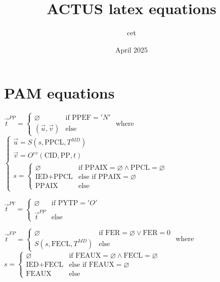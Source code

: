 \documentclass[10pt,a4paper,twoside]{article}
\title{ACTUS latex equations}
\author{cet}
\date{April 2025}
\begin{document}
\maketitle

\tableofcontents


\section{PAM equations}

$\boxed{
    \vec{t}^{PP} = 
    \begin{cases}
        \varnothing & \text{if } \text{PPEF} = 'N' \\
        (\vec{u}, \vec{v}) & \text{else}
    \end{cases}
}$
where $ 
\begin{cases}
    \vec{u} = S(s, \text{PPCL}, T^{MD}) \\
    \vec{v} = O^{ev}(\text{CID}, \text{PP}, t) \\
    s = \begin{cases}
        \varnothing & \text{if } \text{PPAIX} = \varnothing \land \text{PPCL} = \varnothing \\
        \text{IED} + \text{PPCL} & \text{else if } \text{PPAIX} = \varnothing \\
        \text{PPAIX} & \text{else}
    \end{cases}
\end{cases}$

$\boxed{
    \vec{t}^{PY} = 
    \begin{cases}
        \varnothing & \text{if } \text{PYTP} = 'O' \\
        \vec{t}^{PP} & \text{else}
    \end{cases}
}$

$\boxed{
    \vec{t}^{FP} = 
    \begin{cases}
        \varnothing & \text{if } \text{FER} = \varnothing \lor \text{FER} = 0 \\
        S(s, \text{FECL}, T^{MD}) & \text{else}
    \end{cases}
}$
where $s = \begin{cases}
    \varnothing & \text{if } \text{FEAUX} = \varnothing \land \text{FECL} = \varnothing \\
    \text{IED} + \text{FECL} & \text{else if } \text{FEAUX} = \varnothing \\
    \text{FEAUX} & \text{else}
\end{cases}$
\end{document}
